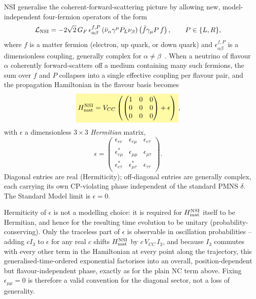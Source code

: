 \begin{theorybox}
NSI generalise the coherent-forward-scattering picture by allowing new,
model-independent four-fermion operators of the form
\begin{equation}
  \mathcal{L}_{\rm NSI} = -2\sqrt2\,G_F\,\epsilon_{\alpha\beta}^{f,P}
  \left(\bar\nu_\alpha\gamma^\mu P_L\nu_\beta\right)
  \left(\bar f\gamma_\mu P\, f\right),
  \qquad P\in\{L,R\},
\end{equation}
where $f$ is a matter fermion (electron, up quark, or down quark) and
$\epsilon_{\alpha\beta}^{f,P}$ is a dimensionless coupling, generally complex
for $\alpha\neq\beta$~\parencite{Grossman1995}. When a neutrino of flavour
$\alpha$ coherently forward-scatters off a medium containing many such
fermions, the sum over $f$ and $P$ collapses into a single effective coupling
per flavour pair, and the propagation Hamiltonian in the flavour basis
becomes
\begin{equation}
  \keyresult{H_{\rm mat}^{\rm NSI} = V_{CC}\left(\begin{pmatrix}1&0&0\\0&0&0\\0&0&0\end{pmatrix} + \epsilon\right)},
\end{equation}
with $\epsilon$ a dimensionless $3\times3$ \emph{Hermitian} matrix,
\begin{equation}
  \epsilon = \begin{pmatrix}
    \epsilon_{ee} & \epsilon_{e\mu} & \epsilon_{e\tau} \\
    \epsilon_{e\mu}^* & \epsilon_{\mu\mu} & \epsilon_{\mu\tau} \\
    \epsilon_{e\tau}^* & \epsilon_{\mu\tau}^* & \epsilon_{\tau\tau}
  \end{pmatrix}.
  \label{eq:epsilon-matrix}
\end{equation}
Diagonal entries are real (Hermiticity); off-diagonal entries are generally
complex, each carrying its own CP-violating phase independent of the
standard PMNS $\delta$. The Standard Model limit is $\epsilon=0$.

Hermiticity of $\epsilon$ is not a modelling choice: it is required for
$H_{\rm mat}^{\rm NSI}$ itself to be Hermitian, and hence for the resulting
time evolution to be unitary (probability-conserving). Only the traceless
part of $\epsilon$ is observable in oscillation probabilities -- adding
$cI_3$ to $\epsilon$ for any real $c$ shifts $H_{\rm mat}^{\rm NSI}$ by
$c\,V_{CC}\,I_3$, and because $I_3$ commutes with every other term in the
Hamiltonian at every point along the trajectory, this generalised-time-ordered
exponential factorises into an overall, position-dependent but
flavour-independent phase, exactly as for the plain NC term above. Fixing
$\epsilon_{\mu\mu}=0$ is therefore a valid convention for the diagonal
sector, not a loss of generality.
\end{theorybox}

